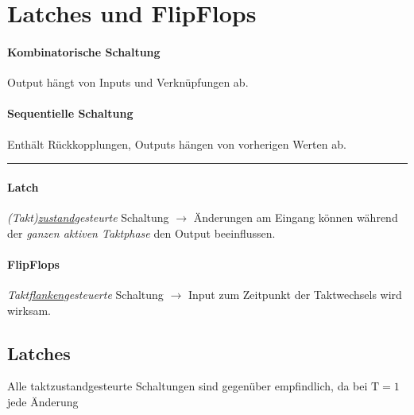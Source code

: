 \section{Latches und FlipFlops}
\begin{center}
    \begin{minipage}[t]{0.45\linewidth}
        \paragraph{Kombinatorische Schaltung}
        Output hängt von Inputs und Verknüpfungen ab.
    \end{minipage}
    \hfill
    \begin{minipage}[t]{0.45\linewidth}
        \paragraph{Sequentielle Schaltung}
        Enthält Rückkopplungen, Outputs hängen von vorherigen Werten ab.
    \end{minipage}
\end{center}
\hrule
\begin{center}
    \begin{minipage}[t]{0.45\linewidth}
        \paragraph{Latch}
        \emph{(Takt)\underline{zustand}gesteurte} Schaltung $\rightarrow$ Änderungen am Eingang können während der \emph{ganzen aktiven Taktphase} den Output beeinflussen.
    \end{minipage}
    \hfill
    \begin{minipage}[t]{0.45\linewidth}
        \paragraph{FlipFlops}
        \emph{Takt\underline{flanken}gesteuerte} Schaltung $\rightarrow$ Input zum Zeitpunkt der Taktwechsels wird wirksam.
    \end{minipage}
\end{center}
\subsection{Latches}
Alle taktzustandgesteurte Schaltungen sind gegenüber  empfindlich, da bei $\text{T}=1$ jede Änderung 
